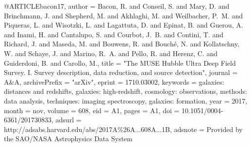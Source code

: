 %
%

@ARTICLE{bacon17,
   author = {{Bacon}, R. and {Conseil}, S. and {Mary}, D. and {Brinchmann}, J. and
	{Shepherd}, M. and {Akhlaghi}, M. and {Weilbacher}, P.~M. and
	{Piqueras}, L. and {Wisotzki}, L. and {Lagattuta}, D. and {Epinat}, B. and
	{Guerou}, A. and {Inami}, H. and {Cantalupo}, S. and {Courbot}, J.~B. and
	{Contini}, T. and {Richard}, J. and {Maseda}, M. and {Bouwens}, R. and
	{Bouch{\'e}}, N. and {Kollatschny}, W. and {Schaye}, J. and
	{Marino}, R.~A. and {Pello}, R. and {Herenz}, C. and {Guiderdoni}, B. and
	{Carollo}, M.},
    title = "{The MUSE Hubble Ultra Deep Field Survey. I. Survey description, data reduction, and source detection}",
  journal = {A\&A},
archivePrefix = "arXiv",
   eprint = {1710.03002},
 keywords = {galaxies: distances and redshifts, galaxies: high-redshift, cosmology: observations, methods: data analysis, techniques: imaging spectroscopy, galaxies: formation},
     year = 2017,
    month = nov,
   volume = 608,
      eid = {A1},
    pages = {A1},
      doi = {10.1051/0004-6361/201730833},
   adsurl = {http://adsabs.harvard.edu/abs/2017A\%26A...608A...1B},
  adsnote = {Provided by the SAO/NASA Astrophysics Data System}
}
